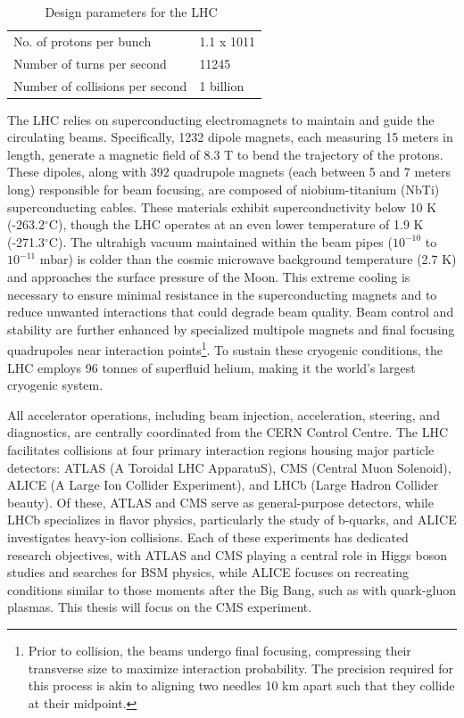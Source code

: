 \begin{table}[]
\begin{tabular}{|l|l|}
    No. of protons per bunch        & 1.1 x 1011                                                                      \\
    Number of turns per second      & 11245                                                                           \\
    Number of collisions per second & 1 billion                                                                       \\ \hline
    \end{tabular}
    \caption{Design parameters for the LHC~\cite{CERNBroc79}}
    \label{tab:LHCparam}
\end{table}

The LHC relies on superconducting electromagnets to maintain and guide the circulating beams. Specifically, 1232 dipole magnets, each measuring 15 meters in length, generate a magnetic field of 8.3 T to bend the trajectory of the protons. These dipoles, along with 392 quadrupole magnets (each between 5 and 7 meters long) responsible for beam focusing, are composed of niobium-titanium (NbTi) superconducting cables. These materials exhibit superconductivity below 10 K (-263.2$^{\circ}$C), though the LHC operates at an even lower temperature of 1.9 K (-271.3$^{\circ}$C). The ultrahigh vacuum maintained within the beam pipes ($10^{-10}$ to $10^{-11}$ mbar) is colder than the cosmic microwave background temperature (2.7 K) and approaches the surface pressure of the Moon. This extreme cooling is necessary to ensure minimal resistance in the superconducting magnets and to reduce unwanted interactions that could degrade beam quality. Beam control and stability are further enhanced by specialized multipole magnets and final focusing quadrupoles near interaction points\footnote{Prior to collision, the beams undergo final focusing, compressing their transverse size to maximize interaction probability. The precision required for this process is akin to aligning two needles 10 km apart such that they collide at their midpoint.}. To sustain these cryogenic conditions, the LHC employs 96 tonnes of superfluid helium, making it the world’s largest cryogenic system.

All accelerator operations, including beam injection, acceleration, steering, and diagnostics, are centrally coordinated from the CERN Control Centre. The LHC facilitates collisions at four primary interaction regions housing major particle detectors: ATLAS (A Toroidal LHC ApparatuS), CMS (Central Muon Solenoid), ALICE (A Large Ion Collider Experiment), and LHCb (Large Hadron Collider beauty). Of these, ATLAS and CMS serve as general-purpose detectors, while LHCb specializes in flavor physics, particularly the study of b-quarks, and ALICE investigates heavy-ion collisions. Each of these experiments has dedicated research objectives, with ATLAS and CMS playing a central role in Higgs boson studies and searches for BSM physics, while ALICE focuses on recreating conditions similar to those moments after the Big Bang, such as with quark-gluon plasmas. This thesis will focus on the CMS experiment.

